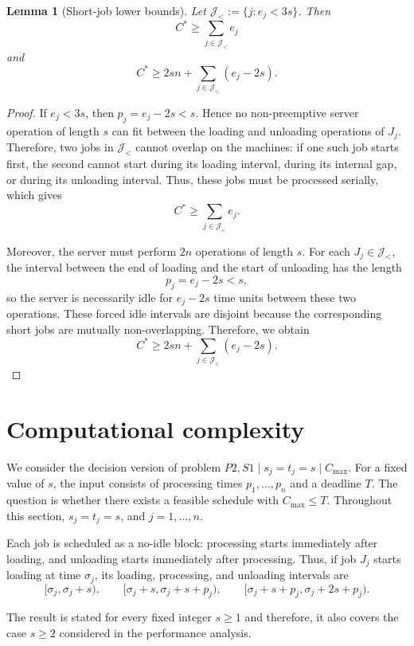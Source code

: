 \documentclass[11pt]{article}
\newtheorem{lemma}{Lemma}
\begin{document}
\begin{lemma}[Short-job lower bounds]
\label{lem:short_job_lower_bounds}
Let \(\mathcal J_<:=\{j:e_j<3s\}\). Then
\[
C^*\ge \sum_{j\in \mathcal J_<} e_j
\]
and
\[
C^*\ge 2sn+\sum_{j\in \mathcal J_<}(e_j-2s).
\]
\end{lemma}

\begin{proof}
If \(e_j<3s\), then \(p_j=e_j-2s<s\).
Hence no non-preemptive server operation of length \(s\) can fit between the loading
and unloading operations of \(J_j\). Therefore, two jobs in \(\mathcal J_<\) cannot overlap on
the machines: if one such job starts first, the second cannot start during its loading
interval, during its internal gap, or during its unloading interval. Thus, these jobs
must be processed serially, which gives
\[
C^*\ge \sum_{j\in \mathcal J_<}e_j.
\]

Moreover, the server must perform \(2n\) operations of length \(s\). For each
\(J_j\in \mathcal J_<\), the interval between the end of loading and the start of unloading has the 
length
\[
p_j=e_j-2s<s,
\]
so the server is necessarily idle for \(e_j-2s\) time units between these two
operations. These forced idle intervals are disjoint because the corresponding short
jobs are mutually non-overlapping. Therefore, we obtain 
\[
C^*\ge 2sn+\sum_{j\in \mathcal J_<}(e_j-2s).
\]
\end{proof}


\section{Computational complexity}
\label{sec:complexity}

We consider the decision version of problem \(P2,S1\mid s_j=t_j=s\mid C_{\max}\).
For a fixed value of \(s\), the input consists of processing times
\(p_1,\ldots,p_n\) and a deadline \(T\). The question is whether there exists a
feasible schedule with \(C_{\max}\le T\). Throughout this section,
\(s_j=t_j=s\), and \(j=1,\ldots,n\). 

Each job is scheduled as a no-idle block: processing starts immediately after
loading, and unloading starts immediately after processing. Thus, if job \(J_j\)
starts loading at time \(\sigma_j\), its loading, processing, and unloading intervals are
\[
[\sigma_j,\sigma_j+s),\qquad
[\sigma_j+s,\sigma_j+s+p_j),\qquad
[\sigma_j+s+p_j,\sigma_j+2s+p_j).
\]

The result is stated for every fixed integer \(s\ge1\) and therefore, it also covers
the case \(s\ge2\) considered in the performance analysis.
\end{document}
